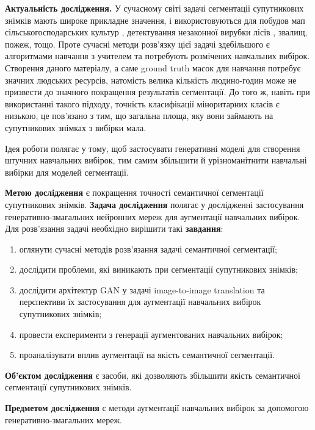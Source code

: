 \textbf{Актуальність дослідження.}
У сучасному світі задачі сегментації супутникових знімків мають
широке прикладне значення, і використовуються для
побудов мап сільськогосподарських культур \cite{kussul2017deep}, детектування незаконної
вирубки лісів \cite{sat_logging}, звалищ, пожеж, тощо. Проте сучасні методи
розв'язку цієї задачі здебільшого є алгоритмами навчання з учителем
та потребують розмічених навчальних вибірок. Створення даного матеріалу,
а саме ground truth масок для навчання потребує значних людських ресурсів, натомість
велика кількість людино-годин може не призвести до значного покращення
результатів сегментації. До того ж, навіть при використанні
такого підходу, точність класифікації міноритарних класів
є низькою, це пов'язано з тим, що загальна площа, яку вони займають
на супутникових знімках з вибірки мала.

Ідея роботи полягає у тому, щоб застосувати генеративні моделі
для створення штучних навчальних вибірок, тим самим збільшити й урізноманітнити
навчальні вибірки для моделей сегментації.

\textbf{Метою дослідження} є покращення точності семантичної сегментації супутникових знімків.
\textbf{Задача дослідження} полягає у дослідженні застосування
генеративно-змагальних нейронних мереж для аугментації навчальних вибірок.
Для розв'язання задачі необхідно вирішити такі \textbf{завдання}:

\begin{enumerate}
    \item оглянути сучасні методів розв'язання задачі
          семантичної сегментації;
    \item дослідити проблеми, які виникають при
          сегментації супутникових знімків;
    \item дослідити архітектур GAN у задачі
          image-to-image translation та перспективи
          їх застосування для аугментації навчальних вибірок супутникових
          знімків;
    \item провести експерименти з генерації
          аугментованих навчальних вибірок;
    \item проаналізувати вплив аугментації на якість семантичної сегментації.
\end{enumerate}

\textbf{Об'єктом дослідження} є засоби, які дозволяють збільшити
якість семантичної сегментації супутникових знімків.

\textbf{Предметом дослідження} є методи аугментації навчальних
вибірок за допомогою генеративно-змагальних мереж.


